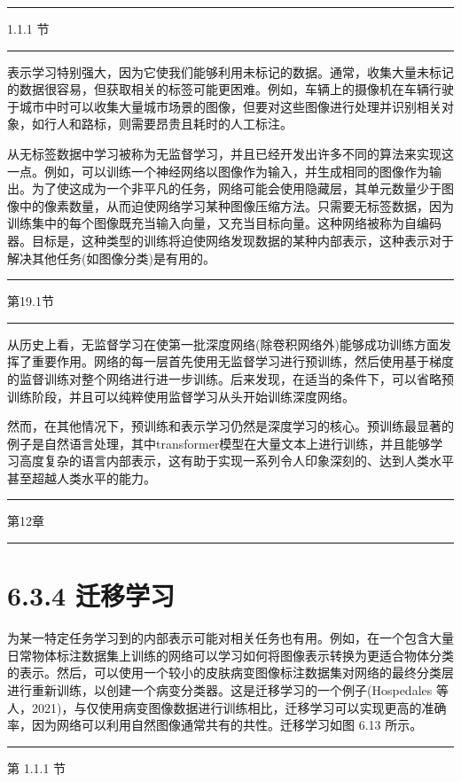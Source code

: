 \documentclass[10pt]{article}
\newcommand{\HRule}{\begin{center}\rule{0.9\linewidth}{0.2mm}\end{center}}
\begin{document}
\HRule

1.1.1 节

\HRule

表示学习特别强大，因为它使我们能够利用未标记的数据。通常，收集大量未标记的数据很容易，但获取相关的标签可能更困难。例如，车辆上的摄像机在车辆行驶于城市中时可以收集大量城市场景的图像，但要对这些图像进行处理并识别相关对象，如行人和路标，则需要昂贵且耗时的人工标注。

从无标签数据中学习被称为无监督学习，并且已经开发出许多不同的算法来实现这一点。例如，可以训练一个神经网络以图像作为输入，并生成相同的图像作为输出。为了使这成为一个非平凡的任务，网络可能会使用隐藏层，其单元数量少于图像中的像素数量，从而迫使网络学习某种图像压缩方法。只需要无标签数据，因为训练集中的每个图像既充当输入向量，又充当目标向量。这种网络被称为自编码器。目标是，这种类型的训练将迫使网络发现数据的某种内部表示，这种表示对于解决其他任务(如图像分类)是有用的。

\HRule

第19.1节

\HRule

从历史上看，无监督学习在使第一批深度网络(除卷积网络外)能够成功训练方面发挥了重要作用。网络的每一层首先使用无监督学习进行预训练，然后使用基于梯度的监督训练对整个网络进行进一步训练。后来发现，在适当的条件下，可以省略预训练阶段，并且可以纯粹使用监督学习从头开始训练深度网络。

然而，在其他情况下，预训练和表示学习仍然是深度学习的核心。预训练最显著的例子是自然语言处理，其中transformer模型在大量文本上进行训练，并且能够学习高度复杂的语言内部表示，这有助于实现一系列令人印象深刻的、达到人类水平甚至超越人类水平的能力。

\HRule

第12章

\HRule

\section*{6.3.4 迁移学习}

为某一特定任务学习到的内部表示可能对相关任务也有用。例如，在一个包含大量日常物体标注数据集上训练的网络可以学习如何将图像表示转换为更适合物体分类的表示。然后，可以使用一个较小的皮肤病变图像标注数据集对网络的最终分类层进行重新训练，以创建一个病变分类器。这是迁移学习的一个例子(Hospedales 等人，2021)，与仅使用病变图像数据进行训练相比，迁移学习可以实现更高的准确率，因为网络可以利用自然图像通常共有的共性。迁移学习如图 6.13 所示。

\HRule

第 1.1.1 节
\end{document}
